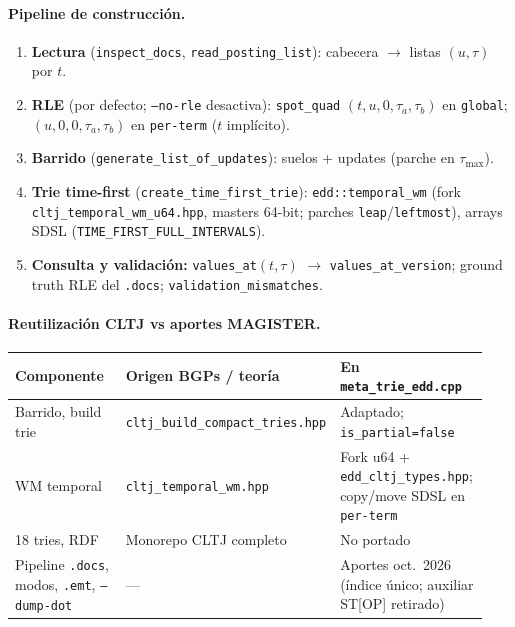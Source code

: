 \paragraph{Pipeline de construcción.}
\begin{enumerate}
\item \textbf{Lectura} (\texttt{inspect\_docs}, \texttt{read\_posting\_list}):
      cabecera $\to$ listas $(u,\tau)$ por $t$.
\item \textbf{RLE} (por defecto; \texttt{--no-rle} desactiva): \texttt{spot\_quad}
      $(t,u,0,\tau_a,\tau_b)$ en \texttt{global};
      $(u,0,0,\tau_a,\tau_b)$ en \texttt{per-term} ($t$ implícito).
\item \textbf{Barrido} (\texttt{generate\_list\_of\_updates}): suelos + updates
      (parche en $\tau_{\max}$).
\item \textbf{Trie time-first} (\texttt{create\_time\_first\_trie}):
      \texttt{edd::temporal\_wm} (fork \texttt{cltj\_temporal\_wm\_u64.hpp}, masters 64-bit;
      parches \texttt{leap}/\texttt{leftmost}), arrays SDSL
      (\texttt{TIME\_FIRST\_FULL\_INTERVALS}).
\item \textbf{Consulta y validación:} \texttt{values\_at}$(t,\tau)$ $\to$
      \texttt{values\_at\_version}; ground truth RLE del \texttt{.docs};
      \texttt{validation\_mismatches}.
\end{enumerate}

\paragraph{Reutilización CLTJ vs aportes MAGISTER.}
\begin{center}
\scriptsize
\begin{tabular}{@{}p{0.26\linewidth}p{0.36\linewidth}p{0.32\linewidth}@{}}
\hline
Componente & Origen BGPs / teoría & En \texttt{meta\_trie\_edd.cpp} \\
\hline
Barrido, build trie &
  \texttt{cltj\_build\_compact\_tries.hpp} &
  Adaptado; \texttt{is\_partial=false} \\
WM temporal &
  \texttt{cltj\_temporal\_wm.hpp}~\cite{Arroyuelo2026TemporalBGPs} &
  Fork u64 + \texttt{edd\_cltj\_types.hpp}; copy/move SDSL en \texttt{per-term} \\
18 tries, RDF &
  Monorepo CLTJ completo &
  No portado \\
Pipeline \texttt{.docs}, modos, \texttt{.emt}, \texttt{--dump-dot} &
  --- &
  Aportes oct.~2026 (índice único; auxiliar ST[OP] retirado) \\
\hline
\end{tabular}
\end{center}

